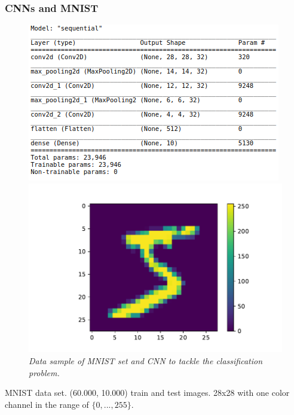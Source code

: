 \documentclass{beamer}
\begin{document}
\begin{frame}
\frametitle{CNNs and MNIST}
\begin{figure}[t]
	\begin{minipage}{0.5\linewidth}
		\includegraphics[scale=0.4]{mnist_cnn.png}
	\end{minipage}
	\begin{minipage}{0.45\linewidth}
		\includegraphics[scale=0.4]{mnist_digit.pdf}
	\end{minipage}
	\caption{\it Data sample of MNIST set and CNN to tackle the classification problem.}
	\label{fig:mnist}
\end{figure}
MNIST data set. (60.000, 10.000) train and test images. 28x28 with one color channel in the range of $\{0, ... , 255\}$.
\end{frame}
\end{document}
